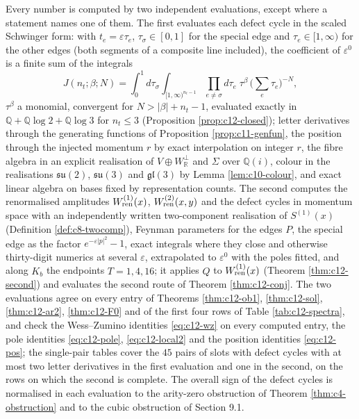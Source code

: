\begin{remark}
\label{rem:c12-method}
Every number is computed by two independent evaluations, except where a statement names one of them. The first evaluates each defect cycle in the scaled Schwinger form: with $t_e=\varepsilon\tau_e$, $\tau_\sigma\in[0,1]$ for the special edge and $\tau_e\in[1,\infty)$ for the other edges (both segments of a composite line included), the coefficient of $\varepsilon^0$ is a finite sum of the integrals
\[
J(n_t;\beta;N)=\int_0^1d\tau_\sigma\int_{[1,\infty)^{n_t-1}}\prod_{e\neq\sigma}d\tau_e\;\tau^\beta\,\Big(\sum_e\tau_e\Big)^{-N},
\]
$\tau^\beta$ a monomial, convergent for $N>|\beta|+n_t-1$, evaluated exactly in $\mathbb Q+\mathbb Q\log2+\mathbb Q\log3$ for $n_t\le3$ (Proposition \ref{prop:c12-closed}); letter derivatives through the generating functions of Proposition \ref{prop:c11-genfun}, the position through the injected momentum $r$ by exact interpolation on integer $r$, the fibre algebra in an explicit realisation of $V\oplus W_{\mathbb R}^\perp$ and $\Sigma$ over $\mathbb Q(i)$, colour in the realisations $\mathfrak{su}(2)$, $\mathfrak{su}(3)$ and $\mathfrak{gl}(3)$ by Lemma \ref{lem:c10-colour}, and exact linear algebra on bases fixed by representation counts. The second computes the renormalised amplitudes $W^{(1)}_{\rm ren}(x)$, $W^{(2)}_{\rm ren}(x,y)$ and the defect cycles in momentum space with an independently written two-component realisation of $S^{(1)}(x)$ (Definition \ref{def:c8-twocomp}), Feynman parameters for the edges $P$, the special edge as the factor $e^{-\varepsilon|p|^2}-1$, exact integrals where they close and otherwise thirty-digit numerics at several $\varepsilon$, extrapolated to $\varepsilon^0$ with the poles fitted, and along $K_b$ the endpoints $T=1,4,16$; it applies $Q$ to $W^{(1)}_{\rm ren}(x)$ (Theorem \ref{thm:c12-second}) and evaluates the second route of Theorem \ref{thm:c12-conj}. The two evaluations agree on every entry of Theorems \ref{thm:c12-ob1}, \ref{thm:c12-sol}, \ref{thm:c12-ar2}, \ref{thm:c12-F0} and of the first four rows of Table \ref{tab:c12-spectra}, and check the Wess--Zumino identities \eqref{eq:c12-wz} on every computed entry, the pole identities \eqref{eq:c12-pole}, \eqref{eq:c12-local2} and the position identities \eqref{eq:c12-pos}; the single-pair tables cover the $45$ pairs of slots with defect cycles with at most two letter derivatives in the first evaluation and one in the second, on the rows on which the second is complete. The overall sign of the defect cycles is normalised in each evaluation to the arity-zero obstruction of Theorem \ref{thm:c4-obstruction} and to the cubic obstruction of Section 9.1.
\end{remark}

